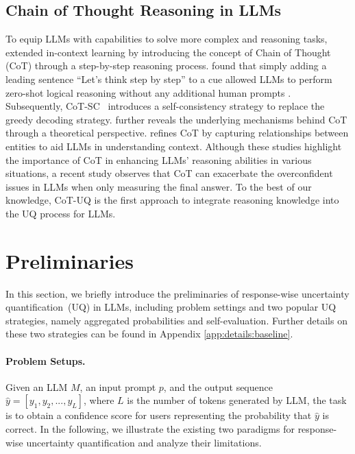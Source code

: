 \documentclass[11pt]{article}
\newcommand{\yhat}{\hat{y}}
\begin{document}
\subsection{Chain of Thought Reasoning in LLMs}
To equip LLMs with capabilities to solve more complex and reasoning tasks, \citet{wei2022chain} extended in-context learning by introducing the concept of Chain of Thought (CoT) through a step-by-step reasoning process. \citet{kojima2022large} found that simply adding a leading sentence “Let’s think step by step” to a cue allowed LLMs to perform zero-shot logical reasoning without any additional human prompts \citep{chu2023survey}. Subsequently, CoT-SC~\citep{wang2022self} introduces a self-consistency strategy to replace the greedy decoding strategy. \citet{feng2024towards} further reveals the underlying mechanisms behind CoT through a theoretical perspective. \citet{liu2024era} refines CoT by capturing relationships between entities to aid LLMs in understanding context. Although these studies highlight the importance of CoT in enhancing LLMs’ reasoning abilities in various situations, a recent study \citep{fu2025multiple} observes that CoT can exacerbate the overconfident issues in LLMs when only measuring the final answer. To the best of our knowledge, CoT-UQ is the first approach to integrate reasoning knowledge into the UQ process for LLMs.

\section{Preliminaries}
\label{sec: prelimi}
In this section, we briefly introduce the preliminaries of response-wise uncertainty quantification~(UQ) in LLMs, including problem settings and two popular UQ strategies, namely aggregated probabilities and self-evaluation. Further details on these two strategies can be found in Appendix \ref{app:details:baseline}.

\paragraph{Problem Setups.}
Given an LLM $M$, an input prompt $p$, and the output sequence $\yhat = [y_1, y_2, ..., y_L]$, where $L$ is the number of tokens generated by LLM, the task is to obtain a confidence score for users representing the probability that $\yhat$ is correct. 
In the following, we illustrate the existing two paradigms for response-wise uncertainty quantification and analyze their limitations.
\end{document}

